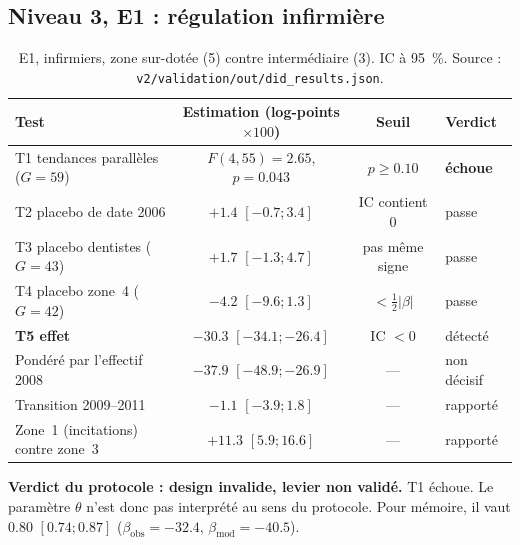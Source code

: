 \documentclass[11pt]{article}
\begin{document}
\subsection{Niveau 3, E1 : régulation infirmière}
\begin{table}[h]
\centering\small
\begin{tabular}{@{}lccl@{}}
\toprule
Test & Estimation (log-points $\times 100$) & Seuil & Verdict \\
\midrule
T1 tendances parallèles ($G = 59$) & $F(4, 55) = \num{2.65}$\mesure{}, $p = \num{0.043}$\mesure{} & $p \ge \num{0.10}$ & \textbf{échoue} \\
T2 placebo de date 2006 & $+\num{1.4}$\mesure{} $[\num{-0.7} ; \num{3.4}]$ & IC contient 0 & passe \\
T3 placebo dentistes ($G = 43$) & $+\num{1.7}$\mesure{} $[\num{-1.3} ; \num{4.7}]$ & pas même signe & passe \\
T4 placebo zone~4 ($G = 42$) & $\num{-4.2}$\mesure{} $[\num{-9.6} ; \num{1.3}]$ & $< \frac12|\beta|$ & passe \\
\textbf{T5 effet} & $\mathbf{\num{-30.3}}$\mesure{} $[\num{-34.1} ; \num{-26.4}]$ & IC $< 0$ & détecté \\
\midrule
Pondéré par l'effectif 2008 & $\num{-37.9}$\mesure{} $[\num{-48.9} ; \num{-26.9}]$ & --- & non décisif \\
Transition 2009--2011 & $\num{-1.1}$\mesure{} $[\num{-3.9} ; \num{1.8}]$ & --- & rapporté \\
Zone~1 (incitations) contre zone~3 & $+\num{11.3}$\mesure{} $[\num{5.9} ; \num{16.6}]$ & --- & rapporté \\
\bottomrule
\end{tabular}
\caption{E1, infirmiers, zone sur-dotée (5) contre intermédiaire (3). IC à 95~\%. Source :
\texttt{v2/validation/out/did\_results.json}.}\label{tab:e1}
\end{table}

\textbf{Verdict du protocole : design invalide, levier non validé.} T1 échoue. Le paramètre
$\theta$ n'est donc pas interprété au sens du protocole. Pour mémoire, il vaut
$\num{0.80}$\mesure{} $[\num{0.74} ; \num{0.87}]$ ($\beta_{\text{obs}} = \num{-32.4}$\mesure{},
$\beta_{\text{mod}} = \num{-40.5}$\mesure{}).
\end{document}
